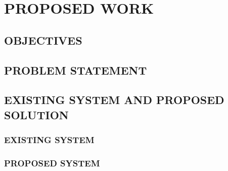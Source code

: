 
\chapter{PROPOSED WORK}
\vspace{-1 cm}
\noindent
\section{OBJECTIVES}
\section{PROBLEM STATEMENT}
\section{EXISTING SYSTEM AND PROPOSED SOLUTION}
\subsection{EXISTING SYSTEM}
\subsection{PROPOSED SYSTEM}